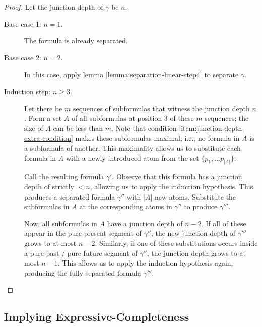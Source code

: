 \documentclass[a4paper,UKenglish,cleveref, autoref, thm-restate, numberwithinsect]{lipics-v2021}
\begin{document}
\begin{proof}
    Let the junction depth of $\gamma$ be $n$.
    \begin{description}
        \item[Base case 1: $n = 1$.] The formula is already separated.
        \item[Base case 2: $n = 2$.] In this case, apply lemma \ref{lemma:separation-linear-step4} to separate $\gamma$.
        \item[Induction step: $n \geq 3$.] Let there be $m$ sequences of subformulas that witness the junction depth $n$. Form a set $A$ of all subformulas at position 3 of these $m$ sequences; the size of $A$ can be less than $m$. Note that condition \ref{item:junction-depth-extra-condition} makes these subformulas maximal; i.e., no formula in $A$ is a subformula of another. This maximality allows us to substitute each formula in $A$ with a newly introduced atom from the set $\{p_1, \ldots p_{|A|}\}$.

        Call the resulting formula $\gamma'$. Observe that this formula has a junction depth of strictly $< n$, allowing us to apply the induction hypothesis. This produces a separated formula $\gamma''$ with $|A|$ new atoms. Substitute the subformulas in $A$ at the corresponding atoms in $\gamma''$ to produce $\gamma'''$.

        Now, all subformulas in $A$ have a junction depth of $n - 2$. If all of these appear in the pure-present segment of $\gamma''$, the new junction depth of $\gamma'''$ grows to at most $n - 2$. Similarly, if one of these substitutions occurs inside a pure-past / pure-future segment of $\gamma''$, the junction depth grows to at most $n - 1$. This allows us to apply the induction hypothesis again, producing the fully separated formula $\gamma'''$.
    \end{description}
\end{proof}

\subsection{Implying Expressive-Completeness}
\end{document}
